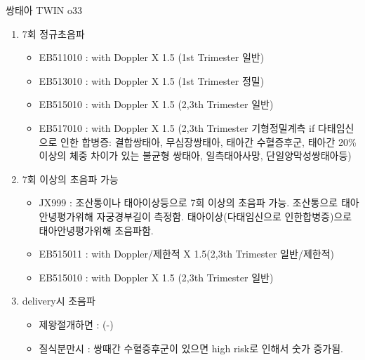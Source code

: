 \par
\medskip
\begin{commentbox}{쌍태아 TWIN o33}
\begin{enumerate}\tightlist
\item 7회 정규초음파
	\begin{itemize}\tightlist
	\item EB511010 : with Doppler X 1.5 (1st Trimester 일반) 
	\item EB513010 : with Doppler X 1.5 (1st Trimester 정밀) 
	\item EB515010 : with Doppler X 1.5 (2,3th Trimester 일반) 
	\item EB517010 : with Doppler X 1.5 (2,3th Trimester 기형정밀계측 if  다태임신으로 인한 합병증: 결합쌍태아, 무심장쌍태아, 태아간 수혈증후군, 태아간 20\% 이상의 체중 차이가 있는 불균형 쌍태아, 일측태아사망, 단일양막성쌍태아등) 
	\end{itemize}
\item 7회 이상의 초음파 가능
	\begin{itemize}\tightlist
	\item JX999 : 조산통이나 태아이상등으로 7회 이상의 초음파 가능. 조산통으로 태아안녕평가위해 자궁경부길이 측정함. 태아이상(다태임신으로 인한합병증)으로 태아안녕평가위해 초음파함.
	\item EB515011 : with Doppler/제한적  X 1.5(2,3th Trimester 일반/제한적)
	\item EB515010 : with Doppler X 1.5 (2,3th Trimester 일반)
	\end{itemize}	
\item delivery시 초음파
	\begin{itemize}\tightlist
	\item 제왕절개하면 : (-)
	\item 질식분만시 : 쌍때간 수혈증후군이 있으면 high risk로 인해서 숫가 증가됨.
	\end{itemize}
\end{enumerate}
\end{commentbox}
